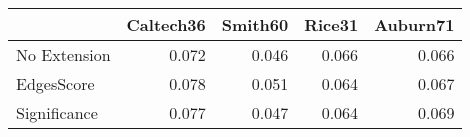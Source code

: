 \begin{tabular}{lrrrr}
\toprule
{} & Caltech36 & Smith60 & Rice31 & Auburn71 \\
\midrule
No Extension &     0.072 &   0.046 &  0.066 &    0.066 \\
EdgesScore   &     0.078 &   0.051 &  0.064 &    0.067 \\
Significance &     0.077 &   0.047 &  0.064 &    0.069 \\
\bottomrule
\end{tabular}
